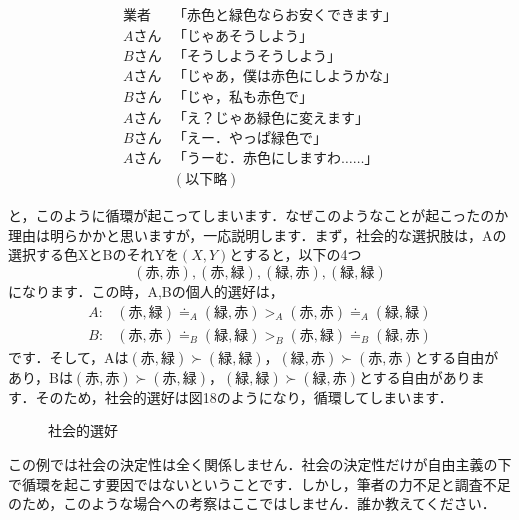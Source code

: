 \begin{align*}
    業者 &　「赤色と緑色ならお安くできます」 \\
    Aさん&　「じゃあそうしよう」\\
    Bさん&　「そうしようそうしよう」\\
    Aさん&　「じゃあ，僕は赤色にしようかな」\\
    Bさん&　「じゃ，私も赤色で」\\
    Aさん&　「え？じゃあ緑色に変えます」\\
    Bさん&　「えー．やっぱ緑色で」\\
    Aさん&　「うーむ．赤色にしますわ……」\\
         &  (以下略)
\end{align*}

と，このように循環が起こってしまいます．なぜこのようなことが起こったのか理由は明らかかと思いますが，一応説明します．まず，社会的な選択肢は，Aの選択する色XとBのそれYを$(X,Y)$とすると，以下の4つ
\begin{equation*}
    (赤,赤),(赤,緑),(緑,赤),(緑,緑)
\end{equation*}
になります．この時，A,Bの個人的選好は，
\begin{align*}
    A : & (赤,緑) \doteq_A (緑,赤) >_A (赤,赤) \doteq_A (緑,緑) \\
    B : & (赤,赤) \doteq_B (緑,緑) >_B (赤,緑) \doteq_B (緑,赤)
\end{align*}
です．そして，Aは$(赤,緑) \succ (緑,緑)$，$(緑,赤) \succ (赤,赤)$とする自由があり，Bは$(赤,赤) \succ (赤,緑)$，$(緑,緑) \succ (緑,赤)$とする自由があります．そのため，社会的選好は図18のようになり，循環してしまいます．

\begin{figure}[!h]
    \centering
    \caption{社会的選好}
\end{figure}

この例では社会の決定性は全く関係しません．社会の決定性だけが自由主義の下で循環を起こす要因ではないということです．しかし，筆者の力不足と調査不足のため，このような場合への考察はここではしません．誰か教えてください．

